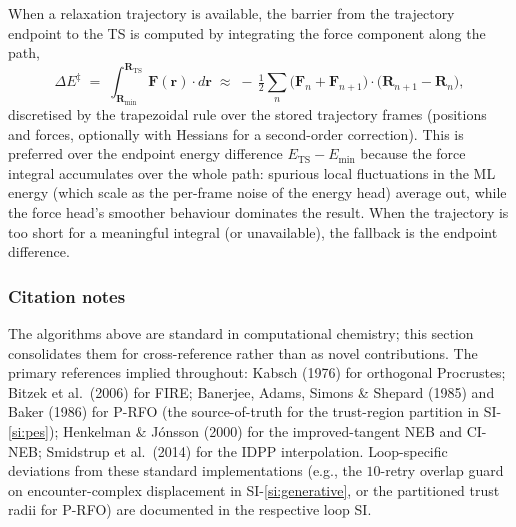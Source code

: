 When a relaxation trajectory is available, the barrier from the trajectory endpoint to the TS is computed by integrating the force component along the path,
\begin{equation}
    \Delta E^\ddagger \;=\; \int_{\mathbf{R}_\text{min}}^{\mathbf{R}_\text{TS}} \mathbf{F}(\mathbf{r}) \cdot d\mathbf{r}
    \;\approx\; -\,\tfrac{1}{2}\sum_{n} \bigl(\mathbf{F}_n + \mathbf{F}_{n+1}\bigr) \cdot \bigl(\mathbf{R}_{n+1} - \mathbf{R}_{n}\bigr),
\end{equation}
discretised by the trapezoidal rule over the stored trajectory frames (positions and forces, optionally with Hessians for a second-order correction). This is preferred over the endpoint energy difference $E_\text{TS} - E_\text{min}$ because the force integral accumulates over the whole path: spurious local fluctuations in the ML energy (which scale as the per-frame noise of the energy head) average out, while the force head's smoother behaviour dominates the result. When the trajectory is too short for a meaningful integral (or unavailable), the fallback is the endpoint difference.


\subsubsection{Citation notes}
\label{sec:shared-cites}

The algorithms above are standard in computational chemistry; this section consolidates them for cross-reference rather than as novel contributions. The primary references implied throughout: Kabsch (1976) for orthogonal Procrustes; Bitzek et al.\ (2006) for FIRE; Banerjee, Adams, Simons \& Shepard (1985) and Baker (1986) for P-RFO (the source-of-truth for the trust-region partition in SI-\ref{si:pes}); Henkelman \& J\'{o}nsson (2000) for the improved-tangent NEB and CI-NEB; Smidstrup et al.\ (2014) for the IDPP interpolation. Loop-specific deviations from these standard implementations (e.g., the $10$-retry overlap guard on encounter-complex displacement in SI-\ref{si:generative}, or the partitioned trust radii for P-RFO) are documented in the respective loop SI.

